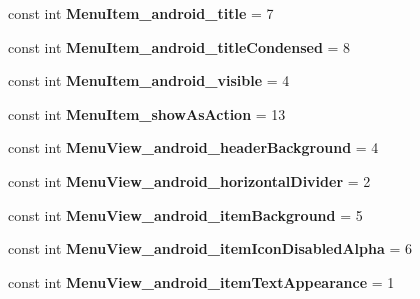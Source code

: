 \begin{DoxyCompactItemize}
const int {\bfseries Menu\+Item\+\_\+android\+\_\+title} = 7
\item 
\mbox{\label{class_pinned_app_1_1_droid_1_1_resource_1_1_styleable_af7b3259a54d684fcf7ec33a5a20b077e}} 
const int {\bfseries Menu\+Item\+\_\+android\+\_\+title\+Condensed} = 8
\item 
\mbox{\label{class_pinned_app_1_1_droid_1_1_resource_1_1_styleable_a3e89d2069dd5f98bf2fa67fd35bd849c}} 
const int {\bfseries Menu\+Item\+\_\+android\+\_\+visible} = 4
\item 
\mbox{\label{class_pinned_app_1_1_droid_1_1_resource_1_1_styleable_a478f40bcd0c771cdf29708b34fa3bd9c}} 
const int {\bfseries Menu\+Item\+\_\+show\+As\+Action} = 13
\item 
\mbox{\label{class_pinned_app_1_1_droid_1_1_resource_1_1_styleable_a14755066a543ca060e13981c43e8bd98}} 
const int {\bfseries Menu\+View\+\_\+android\+\_\+header\+Background} = 4
\item 
\mbox{\label{class_pinned_app_1_1_droid_1_1_resource_1_1_styleable_a817094ac7cef61da0b4fb8e73792d650}} 
const int {\bfseries Menu\+View\+\_\+android\+\_\+horizontal\+Divider} = 2
\item 
\mbox{\label{class_pinned_app_1_1_droid_1_1_resource_1_1_styleable_a1c32c5db441b17b6de03f226724a0bbc}} 
const int {\bfseries Menu\+View\+\_\+android\+\_\+item\+Background} = 5
\item 
\mbox{\label{class_pinned_app_1_1_droid_1_1_resource_1_1_styleable_a8864da74feba555b6f0e3159d78b2db1}} 
const int {\bfseries Menu\+View\+\_\+android\+\_\+item\+Icon\+Disabled\+Alpha} = 6
\item 
\mbox{\label{class_pinned_app_1_1_droid_1_1_resource_1_1_styleable_ad1c232d9ce42d78bb04e8498c7c3de56}} 
const int {\bfseries Menu\+View\+\_\+android\+\_\+item\+Text\+Appearance} = 1

\end{DoxyCompactItemize}
